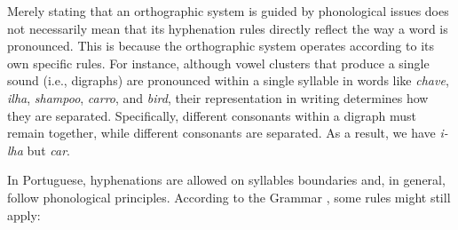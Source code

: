 \documentclass{article}
\begin{document}
Merely stating that an orthographic system is guided by phonological issues
does not necessarily mean that its hyphenation rules directly reflect the way a
word is pronounced. This is because the orthographic system operates according
to its own specific rules. For instance, although vowel clusters that produce a
single sound (i.e., digraphs) are pronounced within a single syllable in words
like \emph{chave}, \emph{ilha}, \emph{shampoo}, \emph{carro}, and \emph{bird},
their representation in writing determines how they are separated.
Specifically, different consonants within a digraph must remain together, while
different consonants are separated. As a result, we have \emph{i-lha} but \emph{car}.

In Portuguese, hyphenations are allowed on syllables boundaries and, in general, follow phonological principles. 
According to
the Grammar \cite{cunha2016,bergstrom2011,cegalla2008}, some rules might still apply:
\end{document}
